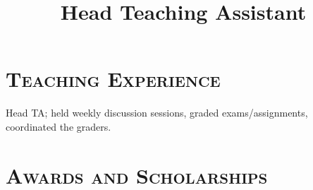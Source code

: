 \begin{resume}


	\section{\textsc{Teaching Experience}}

	\title{Head Teaching Assistant}
	\begin{position}
		Head TA; held weekly discussion sessions, graded exams/assignments, coordinated the
    graders.
	\end{position}


	\section{\textsc{Awards and Scholarships}}

	\begin{formatb}
		\\
		\body\\
	\end{formatb}


\end{resume}
